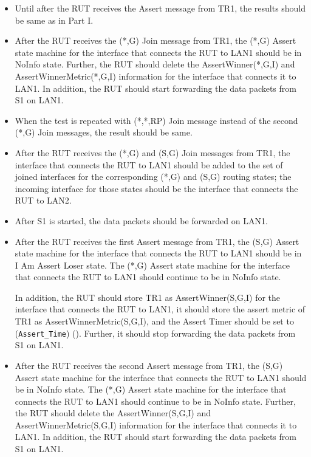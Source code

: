 \documentclass[11pt]{report}
\begin{document}

\begin{itemize}

  \item Until after the RUT receives the Assert message from TR1, the
  results should be same as in Part I.

  \item After the RUT receives the (*,G) Join message from TR1, the (*,G)
  Assert state machine for the interface that connects the RUT to LAN1 should
  be in NoInfo state.
  Further, the RUT should delete the AssertWinner(*,G,I) and
  AssertWinnerMetric(*,G,I) information for the interface that connects it to
  LAN1.
  In addition, the RUT should start forwarding the data packets from S1 on
  LAN1.

  \item When the test is repeated with (*,*,RP) Join message instead of the
  second (*,G) Join messages, the result should be same.

\end{itemize}


\begin{itemize}

  \item After the RUT receives the (*,G) and (S,G) Join messages from TR1, the
  interface that connects the RUT to LAN1 should be
  added to the set of joined interfaces for the corresponding (*,G) and (S,G)
  routing states; the incoming interface for those states should be the
  interface that connects the RUT to LAN2.

  \item After S1 is started, the data packets should be forwarded on LAN1.

  \item After the RUT receives the first Assert message from TR1, the (S,G)
  Assert state machine for the interface that connects the RUT to LAN1 should
  be in I Am Assert Loser state. The (*,G) Assert state machine for the
  interface that connects the RUT to LAN1 should continue to be in NoInfo
  state.

  In addition, the RUT should store TR1 as AssertWinner(S,G,I) for the
  interface that connects the RUT to LAN1, it should store the assert metric
  of TR1 as AssertWinnerMetric(S,G,I), and the Assert Timer should be set to
  (\verb=Assert_Time=) ({\PimsmAssertTime}).
  Further, it should stop forwarding the data packets from S1 on LAN1.

  \item After the RUT receives the second Assert message from TR1, the (S,G)
  Assert state machine for the interface that connects the RUT to LAN1 should
  be in NoInfo state. The (*,G) Assert state machine for the
  interface that connects the RUT to LAN1 should continue to be in NoInfo
  state.
  Further, the RUT should delete the AssertWinner(S,G,I) and
  AssertWinnerMetric(S,G,I) information for the interface that connects it to
  LAN1.
  In addition, the RUT should start forwarding the data packets from S1 on
  LAN1.

\end{itemize}
\end{document}
